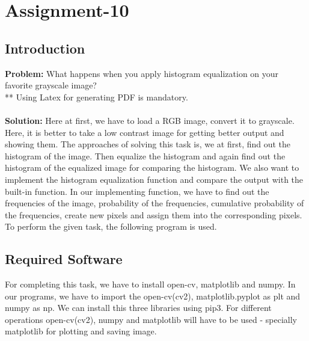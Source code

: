 \documentclass{article}
\begin{document}
{
    \section{Assignment-10}
    \subsection{Introduction}
    \textbf {Problem: }
    What happens when you apply histogram equalization on your favorite grayscale image?\\
    ** Using Latex for generating PDF is mandatory.\\
    \\
    \textbf{Solution: }
    Here at first, we have to load a RGB image, convert it to grayscale. Here, it is better to take a low contrast image for getting better output and showing them. The approaches of solving this task is, we at first, find out the histogram of the image. Then equalize the histogram and again find out the histogram of the equalized image for comparing the histogram. We also want to implement the histogram equalization function and compare the output with the built-in function. In our implementing function, we have to find out the frequencies of the image, probability of the frequencies, cumulative probability of the frequencies, create new pixels and assign them into the corresponding pixels. To perform the given task, the following program is used.
    \\
    
    \subsection{Required Software}
    For completing this task, we have to install open-cv, matplotlib and numpy. In our programs, we have to import the open-cv(cv2), matplotlib.pyplot as plt and numpy as np. We can install this three libraries using pip3. For different operations open-cv(cv2), numpy and matplotlib will have to be used - specially matplotlib for plotting and saving image. 
    \\
    
}
\end{document}
